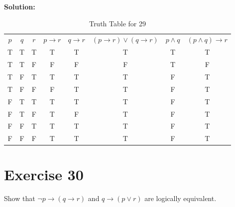 \documentclass{Axon}
\begin{document}
\noindent
\textbf{Solution:}
\begin{table}[ht]
    \centering
    \begin{tabular}{c|c|c|c|c|c|c|c}
        \(p\) & \(q\) & \(r\) & \(p \to r\) & \(q \to r\) & \((p \to r) \lor (q \to r)\) & \(p \land q\) & \((p \land q) \to r\) \\
        T     & T     & T     & T           & T           & T                            & T             & T                     \\
        T     & T     & F     & F           & F           & F                            & T             & F                     \\
        T     & F     & T     & T           & T           & T                            & F             & T                     \\
        T     & F     & F     & F           & T           & T                            & F             & T                     \\
        F     & T     & T     & T           & T           & T                            & F             & T                     \\
        F     & T     & F     & T           & F           & T                            & F             & T                     \\
        F     & F     & T     & T           & T           & T                            & F             & T                     \\
        F     & F     & F     & T           & T           & T                            & F             & T
    \end{tabular}
    \caption{Truth Table for 29}
\end{table}

\section*{Exercise 30}
Show that \(\lnot p \to (q \to r)\) and \(q \to (p \lor r)\) are logically equivalent.
\end{document}
